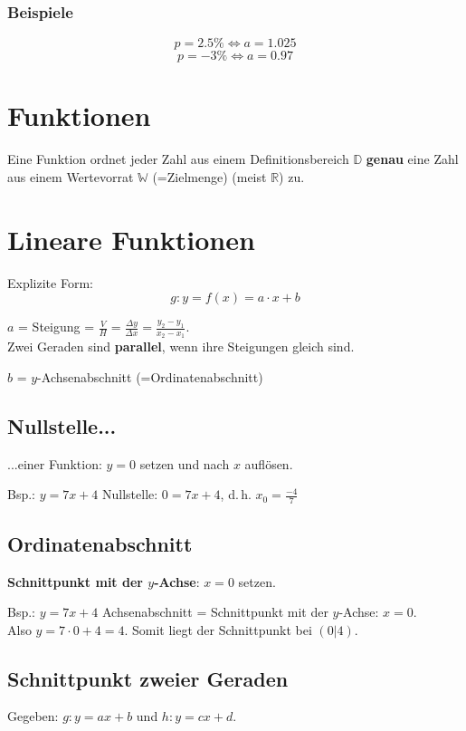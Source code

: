 \begin{multicols}{2}
\subsubsection*{Beispiele}
$$p = 2.5\% \Longleftrightarrow{} a = 1.025$$
$$p = -3\% \Longleftrightarrow{}  a = 0.97 $$

\hrulefill
\section*{Funktionen}

Eine Funktion ordnet jeder Zahl aus einem Definitionsbereich
$\mathbb{D}$ \textbf{genau} eine Zahl aus einem Wertevorrat
$\mathbb{W}$ (=Zielmenge) (meist $\mathbb{R}$) zu.

\hrulefill
\section*{Lineare Funktionen}
Explizite Form:
$$g: y = f(x) = a\cdot{}x + b$$

$a$ = Steigung = $\frac{V}{H}=\frac{\Delta y}{\Delta x} = \frac{y_2-y_1}{x_2-x_1}$.\\
Zwei Geraden sind \textbf{parallel}, wenn ihre Steigungen gleich sind.

$b$ = $y$-Achsenabschnitt (=Ordinatenabschnitt)


\subsection*{Nullstelle...} ...einer Funktion: $y=0$ setzen und nach $x$
auf\/lösen.

Bsp.: $y=7x+4$ Nullstelle: $0 = 7x+4$, d.\,h. $x_0=\frac{-4}{7}$

\subsection*{Ordinatenabschnitt}
\textbf{Schnittpunkt mit der $y$-Achse}: $x=0$ setzen.

Bsp.: $y=7x+4$ Achsenabschnitt = Schnittpunkt mit der $y$-Achse:
$x=0$.\\
Also $y=7\cdot{}0 + 4 = 4$. Somit liegt der Schnittpunkt bei $(0|4)$.


\subsection*{Schnittpunkt zweier Geraden}
Gegeben: $g: y=ax+b$ und $h: y=cx+d$.


\end{multicols}
